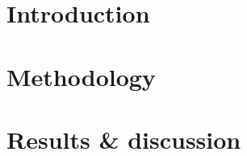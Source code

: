 \documentclass[10pt,a4paper,twoside,openright,titlepage,fleqn,%
               headinclude,,footinclude,BCOR5mm,%
               numbers=noenddot,cleardoublepage=empty,%
               tablecaptionabove]{scrbook}
\begin{document}

\pagestyle{plain}
\dominitoc

\frontmatter


\clearpage

\pagestyle{scrheadings}
\onehalfspacing


\clearpage

\incrementmtc
\incrementmtc
\cleardoublepage

\mainmatter
{}

\part{Introduction}
\label{part:introduction}




\part{Methodology}
\label{part:methodology}



\part{Results \& discussion}
\label{part:results}


% 
% 

\backmatter
\clearpage

\clearpage

\end{document}
